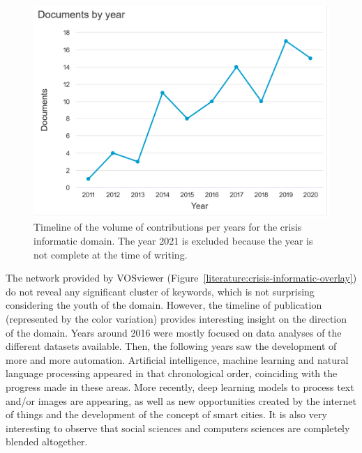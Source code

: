 \begin{figure}[htb]
    \includegraphics[width=\textwidth]{figures/chap-2/crisis-informatic-hist.pdf}
    \caption{Timeline of the volume of contributions per years for the crisis informatic domain. The year 2021 is excluded because the year is not complete at the time of writing.}
    \label{literature:crisis-informatic-hist}
\end{figure}

The network provided by VOSviewer (Figure~\ref{literature:crisis-informatic-overlay}) do not reveal any significant cluster of keywords, which is not surprising considering the youth of the domain.
However, the timeline of publication (represented by the color variation) provides interesting insight on the direction of the domain.
Years around 2016 were mostly focused on data analyses of the different datasets available.
Then, the following years saw the development of more and more automation.
Artificial intelligence, machine learning and natural language processing appeared in that chronological order, coinciding with the progress made in these areas.
More recently, deep learning models to process text and/or images are appearing, as well as new opportunities created by the internet of things and the development of the concept of smart cities.
It is also very interesting to observe that social sciences and computers sciences are completely blended altogether.

